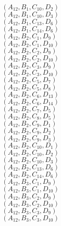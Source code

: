 \documentclass[14pt]{article}
\begin{document}
    $({A}_{12}, {B}_{1}, {C}_{10}, {D}_{2}) $ \\ 
    $({A}_{12}, {B}_{1}, {C}_{10}, {D}_{3}) $ \\ 
    $({A}_{12}, {B}_{1}, {C}_{13}, {D}_{6}) $ \\ 
    $({A}_{12}, {B}_{1}, {C}_{14}, {D}_{6}) $ \\ 
    $({A}_{12}, {B}_{2}, {C}_{1}, {D}_{9}) $ \\ 
    $({A}_{12}, {B}_{2}, {C}_{1}, {D}_{10}) $ \\ 
    $({A}_{12}, {B}_{2}, {C}_{2}, {D}_{9}) $ \\ 
    $({A}_{12}, {B}_{2}, {C}_{2}, {D}_{10}) $ \\ 
    $({A}_{12}, {B}_{2}, {C}_{3}, {D}_{9}) $ \\ 
    $({A}_{12}, {B}_{2}, {C}_{3}, {D}_{10}) $ \\ 
    $({A}_{12}, {B}_{2}, {C}_{5}, {D}_{7}) $ \\ 
    $({A}_{12}, {B}_{2}, {C}_{5}, {D}_{8}) $ \\ 
    $({A}_{12}, {B}_{2}, {C}_{6}, {D}_{13}) $ \\ 
    $({A}_{12}, {B}_{2}, {C}_{6}, {D}_{14}) $ \\ 
    $({A}_{12}, {B}_{2}, {C}_{7}, {D}_{5}) $ \\ 
    $({A}_{12}, {B}_{2}, {C}_{8}, {D}_{5}) $ \\ 
    $({A}_{12}, {B}_{2}, {C}_{9}, {D}_{1}) $ \\ 
    $({A}_{12}, {B}_{2}, {C}_{9}, {D}_{2}) $ \\ 
    $({A}_{12}, {B}_{2}, {C}_{9}, {D}_{3}) $ \\ 
    $({A}_{12}, {B}_{2}, {C}_{10}, {D}_{1}) $ \\ 
    $({A}_{12}, {B}_{2}, {C}_{10}, {D}_{2}) $ \\ 
    $({A}_{12}, {B}_{2}, {C}_{10}, {D}_{3}) $ \\ 
    $({A}_{12}, {B}_{2}, {C}_{13}, {D}_{6}) $ \\ 
    $({A}_{12}, {B}_{2}, {C}_{14}, {D}_{6}) $ \\ 
    $({A}_{12}, {B}_{3}, {C}_{1}, {D}_{9}) $ \\ 
    $({A}_{12}, {B}_{3}, {C}_{1}, {D}_{10}) $ \\ 
    $({A}_{12}, {B}_{3}, {C}_{2}, {D}_{9}) $ \\ 
    $({A}_{12}, {B}_{3}, {C}_{2}, {D}_{10}) $ \\ 
    $({A}_{12}, {B}_{3}, {C}_{3}, {D}_{9}) $ \\ 
    $({A}_{12}, {B}_{3}, {C}_{3}, {D}_{10}) $ \\ 
\end{document}
